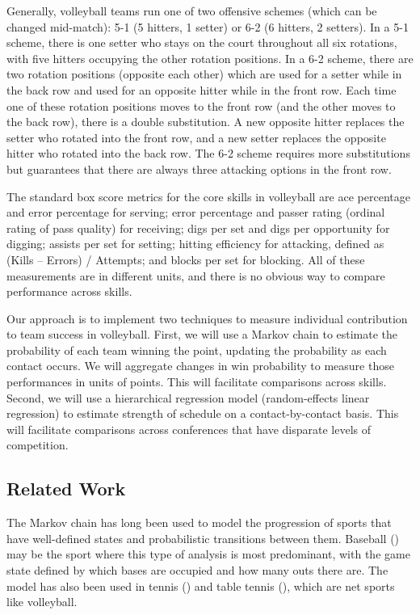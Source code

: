 \documentclass[USenglish]{article}
\theoremstyle{dgthm}
\theoremstyle{dgdef}
\begin{document}
Generally, volleyball teams run one of two offensive schemes (which can be changed mid-match): 5-1 (5 hitters, 1 setter) or 6-2 (6 hitters, 2 setters). In a 5-1 scheme, there is one setter who stays on the court throughout all six rotations, with five hitters occupying the other rotation positions. In a 6-2 scheme, there are two rotation positions (opposite each other) which are used for a setter while in the back row and used for an opposite hitter while in the front row. Each time one of these rotation positions moves to the front row (and the other moves to the back row), there is a double substitution. A new opposite hitter replaces the setter who rotated into the front row, and a new setter replaces the opposite hitter who rotated into the back row. The 6-2 scheme requires more substitutions but guarantees that there are always three attacking options in the front row.

The standard box score metrics for the core skills in volleyball are ace percentage and error percentage for serving; error percentage and passer rating (ordinal rating of pass quality) for receiving; digs per set and digs per opportunity for digging; assists per set for setting; hitting efficiency for attacking, defined as (Kills -- Errors) / Attempts; and blocks per set for blocking. All of these measurements are in different units, and there is no obvious way to compare performance across skills.

Our approach is to implement two techniques to measure individual contribution to team success in volleyball. First, we will use a Markov chain to estimate the probability of each team winning the point, updating the probability as each contact occurs. We will aggregate changes in win probability to measure those performances in units of points. This will facilitate comparisons across skills. Second, we will use a hierarchical regression model (random-effects linear regression) to estimate strength of schedule on a contact-by-contact basis. This will facilitate comparisons across conferences that have disparate levels of competition.


\subsection{Related Work}
\label{sec:related-work}

The Markov chain has long been used to model the progression of sports that have well-defined states and probabilistic transitions between them. Baseball (\cite{bukiet_etal_1997}) may be the sport where this type of analysis is most predominant, with the game state defined by which bases are occupied and how many outs there are. The model has also been used in tennis (\cite{newton_etal_2009}) and table tennis (\cite{pfeiffer_etal_2010}), which are net sports like volleyball.
\end{document}
